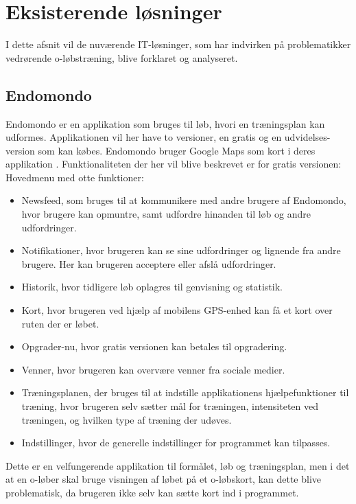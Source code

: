 \newpage
\section{Eksisterende løsninger}
I dette afsnit vil de nuværende IT-løsninger, som har indvirken på problematikker vedrørende o-løbstræning, blive forklaret og analyseret. 

\subsection{Endomondo}
Endomondo er en applikation som bruges til løb, hvori en træningsplan kan udformes. Applikationen vil her have to versioner, en gratis og en udvidelses-version som kan købes. Endomondo bruger Google Maps som kort i deres applikation \citep{ENDOMAPS}. Funktionaliteten der her vil blive beskrevet er for gratis versionen: Hovedmenu med otte funktioner:
\begin{itemize}
	\item Newsfeed, som bruges til at kommunikere med andre brugere af Endomondo, hvor brugere kan opmuntre, samt udfordre hinanden til løb og andre udfordringer.
	\item Notifikationer, hvor brugeren kan se sine udfordringer og lignende fra andre brugere. Her kan brugeren acceptere eller afslå udfordringer.
	\item Historik, hvor tidligere løb oplagres til genvisning og statistik.
	\item Kort, hvor brugeren ved hjælp af mobilens GPS-enhed kan få et kort over ruten der er løbet.
	\item Opgrader-nu, hvor gratis versionen kan betales til opgradering.
	\item Venner, hvor brugeren kan overvære venner fra sociale medier.
	\item Træningsplanen, der bruges til at indstille applikationens hjælpefunktioner til træning, hvor brugeren selv sætter mål for træningen, intensiteten ved træningen, og hvilken type af træning der udøves.
	\item Indstillinger, hvor de generelle indstillinger for programmet kan tilpasses.
\end{itemize}
Dette er en velfungerende applikation til formålet, løb og træningsplan, men i det at en o-løber skal bruge visningen af løbet på et o-løbskort, kan dette blive problematisk, da brugeren ikke selv kan sætte kort ind i programmet. 


